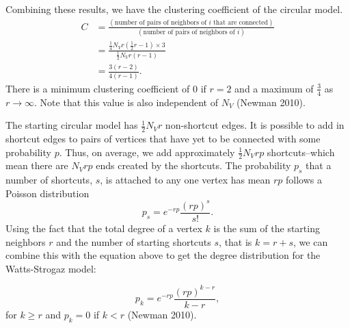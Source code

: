 \documentclass[12pt,twoside]{amherstthesis}
\begin{document}
  Combining these results, we have the clustering coefficient of the
  circular model. \[
  \begin{aligned}
  C &= \frac {(\text{number of pairs of neighbors of } i \text{ that are connected})} {(\text{number of pairs of neighbors of } i)} \\
  &= \frac {\frac {1} {4} N_{V} r \left(\frac {1} {2} r - 1 \right) \times 3} {\frac {1} {2} N_{V} r(r - 1)} \\
  &= \frac {3(r - 2)} {4(r - 1)}.
  \end{aligned}
  \] There is a minimum clustering coefficient of \(0\) if \(r = 2\) and a
  maximum of \(\frac {3} {4}\) as \(r \to \infty\). Note that this value
  is also independent of \(N_{V}\) (Newman 2010).
  
  The starting circular model has \(\frac {1} {2} N_{V}r\) non-shortcut
  edges. It is possible to add in shortcut edges to pairs of vertices that
  have yet to be connected with some probability \(p\). Thus, on average,
  we add approximately \(\frac {1} {2} N_{V}rp\) shortcuts--which mean
  there are \(N_{V}rp\) ends created by the shortcuts. The probability
  \(p_{s}\) that a number of shortcuts, \(s\), is attached to any one
  vertex has mean \(rp\) follows a Poisson distribution
  \[p_{s} = e^{-rp} \frac {(rp)^{s}} {s!}.\] Using the fact that the total
  degree of a vertex \(k\) is the sum of the starting neighbors \(r\) and
  the number of starting shortcuts \(s\), that is \(k = r + s\), we can
  combine this with the equation above to get the degree distribution for
  the Watts-Strogaz model:
  
  \[p_{k} = e^{-rp}\frac {(rp)^{k - r}} {k - r},\] for \(k \geq r\) and
  \(p_{k} = 0\) if \(k < r\) (Newman 2010).
  
\end{document}
